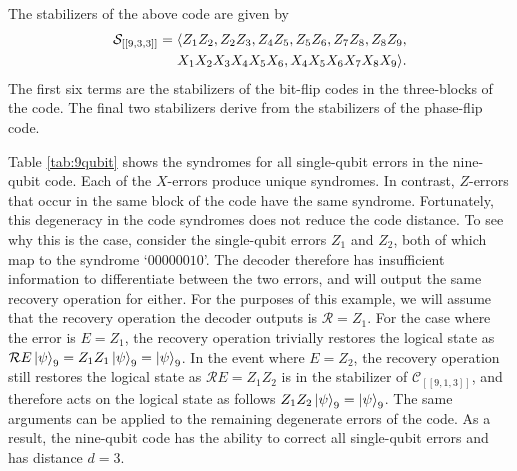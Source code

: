 \documentclass[]{arxiv}
\theoremstyle{plain}%
\theoremstyle{definition}
\theoremstyle{remark}
\begin{document}
%
The stabilizers of the above code are given by
%
\begin{equation}\begin{split}
\mathcal{S}_{[[9,3,3]]}=\langle Z_1Z_2,Z_2Z_3,Z_4Z_5,Z_5Z_6,Z_7Z_8,Z_8Z_9,\\X_1X_2X_3X_4X_5X_6,X_4X_5X_6X_7X_8X_9\rangle\rm.
\end{split}
\end{equation}
%
The first six terms are the stabilizers of the bit-flip codes in the three-blocks of the code. The final two stabilizers derive from the stabilizers of the phase-flip code.

Table \ref{tab:9qubit} shows the syndromes for all single-qubit errors in the nine-qubit code. Each of the $X$-errors produce unique syndromes. In contrast, $Z$-errors that occur in the same block of the code have the same syndrome. Fortunately, this degeneracy in the code syndromes does not reduce the code distance. To see why this is the case, consider the single-qubit errors $Z_1$ and $Z_2$, both of which map to the syndrome `$00000010$'. The decoder therefore has insufficient information to differentiate between the two errors, and will output the same recovery operation for either. For the purposes of this example, we will assume that the recovery operation the decoder outputs is $\mathcal{R}=Z_1$. For the case where the error is $E=Z_1$, the recovery operation trivially restores the logical state as $\mathcal{R}E\ket{\psi}_9= Z_1Z_1\ket{\psi}_9=\ket{\psi}_9$. In the event where $E=Z_2$, the recovery operation still restores the logical state as $\mathcal{R}E=Z_1Z_2$ is in the stabilizer of $\mathcal{C}_{[[9,1,3]]}$, and therefore acts on the logical state as follows $Z_1Z_2\ket{\psi}_9=\ket{\psi}_9$. The same arguments can be applied to the remaining degenerate errors of the code. As a result, the nine-qubit code has the ability to correct all single-qubit errors and has distance $d=3$.
\end{document}
